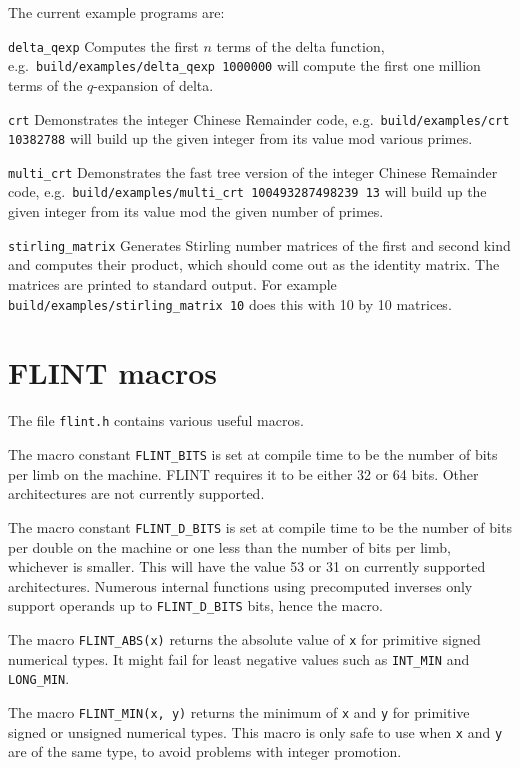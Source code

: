 \documentclass[a4paper,10pt]{book}
\newcommand{\code}{\lstinline}
\begin{document}
The current example programs are:

\code{delta_qexp}  Computes the first $n$ terms of the delta function, e.g.\ 
\code{build/examples/delta_qexp 1000000} will compute the first one million terms of the 
$q$-expansion of delta.

\code{crt}  Demonstrates the integer Chinese Remainder code, e.g.\ 
\code{build/examples/crt 10382788} will build up the given integer from its value mod various
primes.

\code{multi_crt}  Demonstrates the fast tree version of the integer Chinese Remainder 
code, e.g.\ 
\code{build/examples/multi_crt 100493287498239 13} will build up the given integer from 
its value mod the given number of primes.

\code{stirling_matrix}  Generates Stirling number matrices of the first
and second kind and computes their product, which should come out as the
identity matrix. The matrices are printed to standard output.
For example \code{build/examples/stirling_matrix 10} does this
with 10 by 10 matrices.

\chapter{FLINT macros}

The file \code{flint.h} contains various useful macros.

The macro constant \code{FLINT_BITS} is set at compile time to be the 
number of bits per limb on the machine.  FLINT requires it to be either 
32 or 64 bits.  Other architectures are not currently supported.

The macro constant \code{FLINT_D_BITS} is set at compile time to be the 
number of bits per double on the machine or one less than the number of 
bits per limb, whichever is smaller.  This will have the value 53 or 31 
on currently supported architectures.  Numerous internal functions using 
precomputed inverses only support operands up to \code{FLINT_D_BITS} bits, 
hence the macro.

The macro \code{FLINT_ABS(x)} returns the absolute value of \code{x}
for primitive signed numerical types.  It might fail for least negative 
values such as \code{INT_MIN} and \code{LONG_MIN}.

The macro \code{FLINT_MIN(x, y)} returns the minimum of \code{x} and 
\code{y} for primitive signed or unsigned numerical types.  This macro 
is only safe to use when \code{x} and \code{y} are of the same type, 
to avoid problems with integer promotion.
\end{document}
